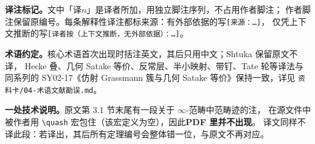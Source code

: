 \documentclass[UTF8, a4paper, 12pt, fontset=fandol, scheme=chinese]{ctexart}
\begin{document}
\textbf{译注标记。}文中「译$n$」是译者所加，用独立脚注序列，不占用作者脚注；
作者脚注保留原编号。每条解释性译注都标来源：有外部依据的写\verb|[来源：…]|，
仅凭上下文推断的写\verb|[译者按（上下文推断，无外部依据）：…]|。

\textbf{术语约定。}核心术语首次出现时括注英文，其后只用中文；Shtuka 保留原文不译，
Hecke 叠、几何 Satake 等价、反常层、半小映射、带钉、Tate 轮等译法与同系列的
SY02-17《仿射 Grassmann 簇与几何 Satake 等价》保持一致，详见
\verb|资料卡/04-术语文献勘误.md|。

\textbf{一处技术说明。}原文第 3.1 节末尾有一段关于 $\infty$-范畴中范畴迹的注，
在源文件中被作者用 \verb|\quash| 宏包住（该宏定义为空），因此\textbf{PDF 里并不出现}。
译文同样不译此段：若译出，其后所有定理编号会整体错一位，与原文不再对应。

\newpage
\tableofcontents
\newpage



























\end{document}
